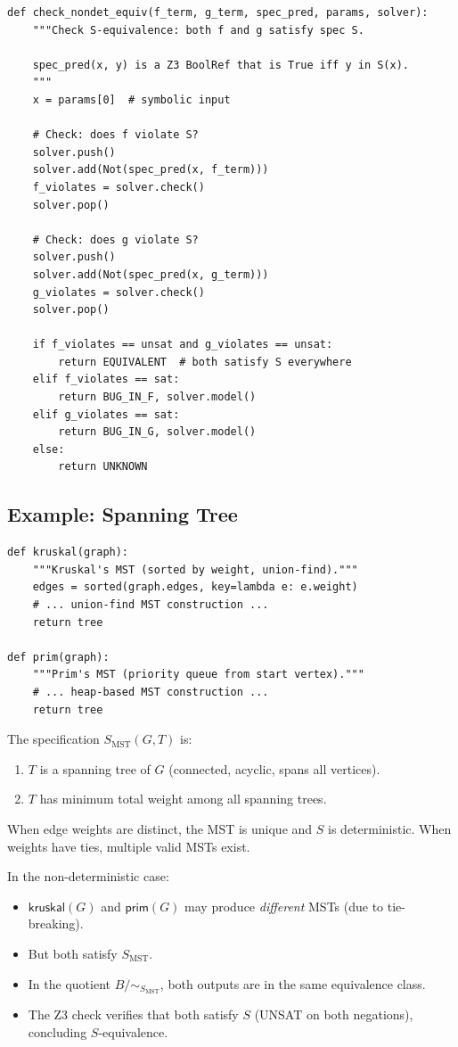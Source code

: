 \begin{lstlisting}[caption={Non-deterministic spec check in Z3}]
def check_nondet_equiv(f_term, g_term, spec_pred, params, solver):
    """Check S-equivalence: both f and g satisfy spec S.

    spec_pred(x, y) is a Z3 BoolRef that is True iff y in S(x).
    """
    x = params[0]  # symbolic input

    # Check: does f violate S?
    solver.push()
    solver.add(Not(spec_pred(x, f_term)))
    f_violates = solver.check()
    solver.pop()

    # Check: does g violate S?
    solver.push()
    solver.add(Not(spec_pred(x, g_term)))
    g_violates = solver.check()
    solver.pop()

    if f_violates == unsat and g_violates == unsat:
        return EQUIVALENT  # both satisfy S everywhere
    elif f_violates == sat:
        return BUG_IN_F, solver.model()
    elif g_violates == sat:
        return BUG_IN_G, solver.model()
    else:
        return UNKNOWN
\end{lstlisting}

\subsection{Example: Spanning Tree}

\begin{lstlisting}[caption={Two spanning tree algorithms}]
def kruskal(graph):
    """Kruskal's MST (sorted by weight, union-find)."""
    edges = sorted(graph.edges, key=lambda e: e.weight)
    # ... union-find MST construction ...
    return tree

def prim(graph):
    """Prim's MST (priority queue from start vertex)."""
    # ... heap-based MST construction ...
    return tree
\end{lstlisting}

The specification $S_{\mathrm{MST}}(G, T)$ is:
\begin{enumerate}
  \item $T$ is a spanning tree of $G$ (connected, acyclic, spans all vertices).
  \item $T$ has minimum total weight among all spanning trees.
\end{enumerate}

When edge weights are distinct, the MST is unique and $S$ is
deterministic.  When weights have ties, multiple valid MSTs exist.

In the non-deterministic case:
\begin{itemize}
  \item $\mathsf{kruskal}(G)$ and $\mathsf{prim}(G)$ may produce
    \emph{different} MSTs (due to tie-breaking).
  \item But both satisfy $S_{\mathrm{MST}}$.
  \item In the quotient $B / {\sim_{S_{\mathrm{MST}}}}$, both outputs
    are in the same equivalence class.
  \item The Z3 check verifies that both satisfy $S$ (UNSAT on both
    negations), concluding $S$-equivalence.
\end{itemize}


